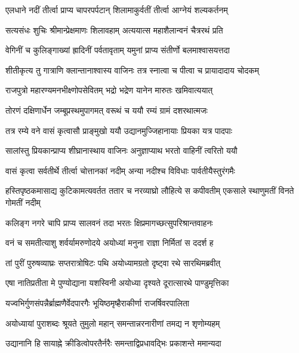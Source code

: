 \twolineshloka
{एलधाने नदीं तीर्त्वा प्राप्य चापरपर्पटान्}
{शिलामाकुर्वतीं तीर्त्वा आग्नेयं शल्यकर्तनम्} %

\twolineshloka
{सत्यसंधः शुचिः श्रीमान्प्रेक्षमाणः शिलावहाम्}
{अत्ययात्स महाशैलान्वनं चैत्ररथं प्रति} %

\twolineshloka
{वेगिनीं च कुलिङ्गाख्यां ह्रादिनीं पर्वतावृताम्}
{यमुनां प्राप्य संतीर्णो बलमाश्वासयत्तदा} %

\twolineshloka
{शीतीकृत्य तु गात्राणि क्लान्तानाश्वास्य वाजिनः}
{तत्र स्नात्वा च पीत्वा च प्रायादादाय चोदकम्} %

\twolineshloka
{राजपुत्रो महारण्यमनभीक्ष्णोपसेवितम्}
{भद्रो भद्रेण यानेन मारुतः खमिवात्ययात्} %

\twolineshloka
{तोरणं दक्षिणार्धेन जम्बूप्रस्थमुपागमत्}
{वरूथं च ययौ रम्यं ग्रामं दशरथात्मजः} %

\twolineshloka
{तत्र रम्ये वने वासं कृत्वासौ प्राङ्मुखो ययौ}
{उद्यानमुज्जिहानायाः प्रियका यत्र पादपाः} %

\twolineshloka
{सालांस्तु प्रियकान्प्राप्य शीघ्रानास्थाय वाजिनः}
{अनुज्ञाप्याथ भरतो वाहिनीं त्वरितो ययौ} %

\twolineshloka
{वासं कृत्वा सर्वतीर्थे तीर्त्वा चोत्तानकां नदीम्}
{अन्या नदीश्च विविधाः पार्वतीयैस्तुरंगमैः} %

\threelineshloka
{हस्तिपृष्ठकमासाद्य कुटिकामत्यवर्तत}
{ततार च नरव्याघ्रो लौहित्ये स कपीवतीम्}
{एकसाले स्थाणुमतीं विनते गोमतीं नदीम्} %

\twolineshloka
{कलिङ्ग नगरे चापि प्राप्य सालवनं तदा}
{भरतः क्षिप्रमागच्छत्सुपरिश्रान्तवाहनः} %

\twolineshloka
{वनं च समतीत्याशु शर्वर्यामरुणोदये}
{अयोध्यां मनुना राज्ञा निर्मितां स ददर्श ह} %

\twolineshloka
{तां पुरीं पुरुषव्याघ्रः सप्तरात्रोषिटः पथि}
{अयोध्यामग्रतो दृष्ट्वा रथे सारथिमब्रवीत्} %

\twolineshloka
{एषा नातिप्रतीता मे पुण्योद्याना यशस्विनी}
{अयोध्या दृश्यते दूरात्सारथे पाण्डुमृत्तिका} %

\twolineshloka
{यज्वभिर्गुणसंपन्नैर्ब्राह्मणैर्वेदपारगैः}
{भूयिष्ठमृष्हैराकीर्णा राजर्षिवरपालिता} %

\twolineshloka
{अयोध्यायां पुराशब्दः श्रूयते तुमुलो महान्}
{समन्तान्नरनारीणां तमद्य न शृणोम्यहम्} %

\twolineshloka
{उद्यानानि हि सायाह्ने क्रीडित्वोपरतैर्नरैः}
{समन्ताद्विप्रधावद्भिः प्रकाशन्ते ममान्यदा} %

